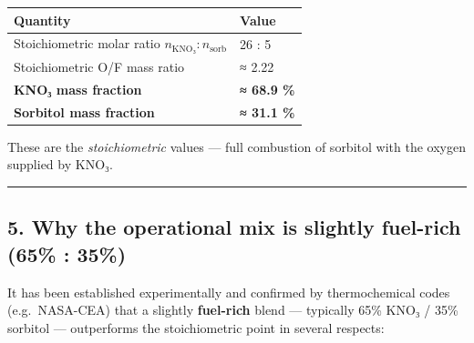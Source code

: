 \documentclass[11pt]{article}
\begin{document}
{\def\LTcaptype{none} %
\begin{longtable}[]{@{}ll@{}}
\toprule\noalign{}
Quantity & Value \\
\midrule\noalign{}
\endhead
\bottomrule\noalign{}
\endlastfoot
Stoichiometric molar ratio \(n_\text{KNO₃} : n_\text{sorb}\) & 26 : 5 \\
Stoichiometric O/F mass ratio & ≈ 2.22 \\
\textbf{KNO₃ mass fraction} & \textbf{≈ 68.9 \%} \\
\textbf{Sorbitol mass fraction} & \textbf{≈ 31.1 \%} \\
\end{longtable}
}

These are the \emph{stoichiometric} values --- full combustion of
sorbitol with the oxygen supplied by KNO₃.

    \begin{center}\rule{0.5\linewidth}{0.5pt}\end{center}

\subsection{5. Why the operational mix is slightly fuel-rich (65\% :
35\%)}\label{why-the-operational-mix-is-slightly-fuel-rich-65-35}

It has been established experimentally and confirmed by thermochemical
codes (e.g.~NASA-CEA) that a slightly \textbf{fuel-rich} blend ---
typically 65\% KNO₃ / 35\% sorbitol --- outperforms the stoichiometric
point in several respects:
\end{document}
